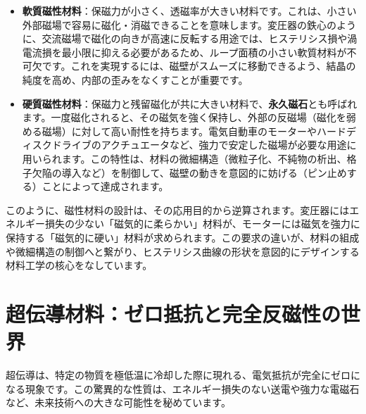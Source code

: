 \documentclass[11pt,a4paper]{ltjsarticle}
\begin{document}
\begin{itemize}
    \item \textbf{軟質磁性材料}：保磁力が小さく、透磁率が大きい材料です。これは、小さい外部磁場で容易に磁化・消磁できることを意味します。変圧器の鉄心のように、交流磁場で磁化の向きが高速に反転する用途では、ヒステリシス損や渦電流損を最小限に抑える必要があるため、ループ面積の小さい軟質材料が不可欠です。これを実現するには、磁壁がスムーズに移動できるよう、結晶の純度を高め、内部の歪みをなくすことが重要です\cite{ref1}。
    \item \textbf{硬質磁性材料}：保磁力と残留磁化が共に大きい材料で、\textbf{永久磁石}とも呼ばれます。一度磁化されると、その磁気を強く保持し、外部の反磁場（磁化を弱める磁場）に対して高い耐性を持ちます。電気自動車のモーターやハードディスクドライブのアクチュエータなど、強力で安定した磁場が必要な用途に用いられます。この特性は、材料の微細構造（微粒子化、不純物の析出、格子欠陥の導入など）を制御して、磁壁の動きを意図的に妨げる（ピン止めする）ことによって達成されます\cite{ref1}。
\end{itemize}
このように、磁性材料の設計は、その応用目的から逆算されます。変圧器にはエネルギー損失の少ない「磁気的に柔らかい」材料が、モーターには磁気を強力に保持する「磁気的に硬い」材料が求められます。この要求の違いが、材料の組成や微細構造の制御へと繋がり、ヒステリシス曲線の形状を意図的にデザインする材料工学の核心をなしています。

\section{超伝導材料：ゼロ抵抗と完全反磁性の世界}
超伝導は、特定の物質を極低温に冷却した際に現れる、電気抵抗が完全にゼロになる現象です。この驚異的な性質は、エネルギー損失のない送電や強力な電磁石など、未来技術への大きな可能性を秘めています。
\end{document}
